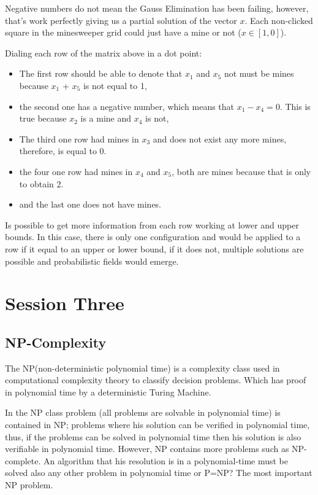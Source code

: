 \documentclass[a4paper]{article}
\numberwithin{equation}{subsection}
\begin{document}
\vspace{5mm} %

Negative numbers do not mean the Gauss Elimination has been failing, however, that’s work perfectly giving us a partial solution of the vector $x$.  Each non-clicked square in the minesweeper grid could just have a mine or not ($x\in [1,0]$).

\vspace{5mm} %

Dialing each row of the matrix above in a dot point:

\begin{itemize}
  \item The first row should be able to denote that $x_1$ and $x_5$ not must be mines because $x_1$ + $x_5$ is not equal to 1,

  \item the second one has a negative number, which means that $x_1 - x_4 = 0$. This is true because $x_2$ is a mine and $x_4$ is not,
  \item The third one row had mines in $x_3$ and does not exist any more mines, therefore, is equal to 0.
\item the four one row had mines in $x_4$ and $x_5$, both are mines because that is only to obtain 2.
\item and the last one does not have mines. 
\end{itemize}

Is possible to get more information from each row working at lower and upper bounds. In this case, there is only one configuration and would be applied to a row if it equal to an upper or lower bound, if it does not, multiple solutions are possible and probabilistic fields would emerge.

\section{Session Three} \label{chap:3}
\subsection{NP-Complexity}

The NP(non-deterministic polynomial time) is a complexity class used in computational complexity theory to classify decision problems. Which has proof in polynomial time by a deterministic Turing Machine. 

\vspace{5mm} %
In the NP class problem (all problems are solvable in polynomial time) is contained in NP; problems where his solution can be verified in polynomial time, thus, if the problems can be solved in polynomial time then his solution is also verifiable in polynomial time. However, NP contains more problems such as NP-complete. An algorithm that his resolution is in a polynomial-time must be solved also any other problem in polynomial time or P=NP? The most important NP problem.
\end{document}
